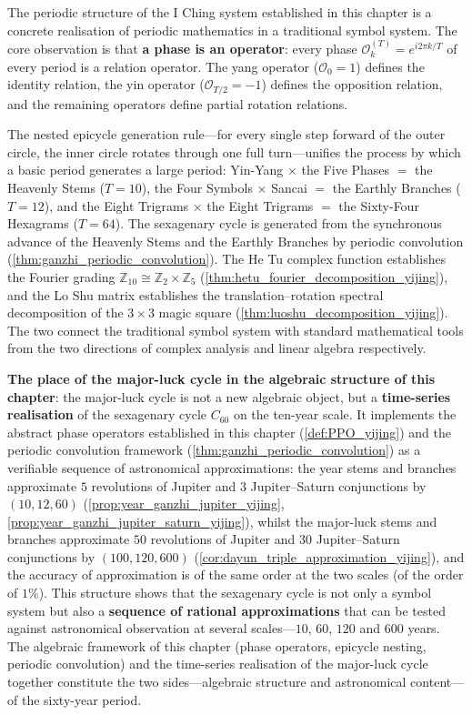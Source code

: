 \begin{remark}\label{rem:yijing_book_interface}
The periodic structure of the I Ching system established in this chapter is a concrete realisation of periodic mathematics in a traditional symbol system. The core observation is that \textbf{a phase is an operator}: every phase $\mathcal{O}_k^{(T)} = e^{i2\pi k/T}$ of every period is a relation operator. The yang operator ($\mathcal{O}_0 = 1$) defines the identity relation, the yin operator ($\mathcal{O}_{T/2} = -1$) defines the opposition relation, and the remaining operators define partial rotation relations.

The nested epicycle generation rule---for every single step forward of the outer circle, the inner circle rotates through one full turn---unifies the process by which a basic period generates a large period: Yin-Yang $\times$ the Five Phases $=$ the Heavenly Stems ($T=10$), the Four Symbols $\times$ Sancai $=$ the Earthly Branches ($T=12$), and the Eight Trigrams $\times$ the Eight Trigrams $=$ the Sixty-Four Hexagrams ($T=64$). The sexagenary cycle is generated from the synchronous advance of the Heavenly Stems and the Earthly Branches by periodic convolution (\cref{thm:ganzhi_periodic_convolution}). The He Tu complex function establishes the Fourier grading $\mathbb{Z}_{10} \cong \mathbb{Z}_2 \times \mathbb{Z}_5$ (\cref{thm:hetu_fourier_decomposition_yijing}), and the Lo Shu matrix establishes the translation--rotation spectral decomposition of the $3 \times 3$ magic square (\cref{thm:luoshu_decomposition_yijing}). The two connect the traditional symbol system with standard mathematical tools from the two directions of complex analysis and linear algebra respectively.

\textbf{The place of the major-luck cycle in the algebraic structure of this chapter}: the major-luck cycle is not a new algebraic object, but a \textbf{time-series realisation} of the sexagenary cycle $C_{60}$ on the ten-year scale. It implements the abstract phase operators established in this chapter (\cref{def:PPO_yijing}) and the periodic convolution framework (\cref{thm:ganzhi_periodic_convolution}) as a verifiable sequence of astronomical approximations: the year stems and branches approximate $5$ revolutions of Jupiter and $3$ Jupiter--Saturn conjunctions by $(10,12,60)$ (\cref{prop:year_ganzhi_jupiter_yijing}, \cref{prop:year_ganzhi_jupiter_saturn_yijing}), whilst the major-luck stems and branches approximate $50$ revolutions of Jupiter and $30$ Jupiter--Saturn conjunctions by $(100,120,600)$ (\cref{cor:dayun_triple_approximation_yijing}), and the accuracy of approximation is of the same order at the two scales (of the order of $1\%$). This structure shows that the sexagenary cycle is not only a symbol system but also a \textbf{sequence of rational approximations} that can be tested against astronomical observation at several scales---$10$, $60$, $120$ and $600$ years. The algebraic framework of this chapter (phase operators, epicycle nesting, periodic convolution) and the time-series realisation of the major-luck cycle together constitute the two sides---algebraic structure and astronomical content---of the sixty-year period.
\end{remark}

